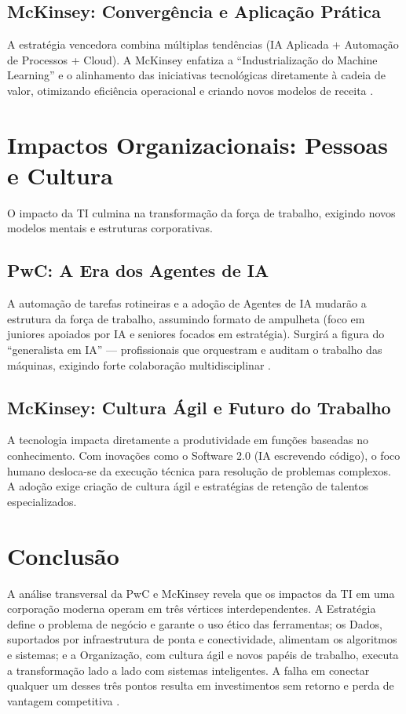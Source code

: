 \documentclass[12pt,a4paper,oneside]{article}
\begin{document}
\subsection{McKinsey: Convergência e Aplicação Prática}

A estratégia vencedora combina múltiplas tendências (IA Aplicada + Automação de Processos + Cloud). A McKinsey enfatiza a ``Industrialização do Machine Learning'' e o alinhamento das iniciativas tecnológicas diretamente à cadeia de valor, otimizando eficiência operacional e criando novos modelos de receita \cite{rocha2018}.

\section{Impactos Organizacionais: Pessoas e Cultura}

O impacto da TI culmina na transformação da força de trabalho, exigindo novos modelos mentais e estruturas corporativas.

\subsection{PwC: A Era dos Agentes de IA}

A automação de tarefas rotineiras e a adoção de Agentes de IA mudarão a estrutura da força de trabalho, assumindo formato de ampulheta (foco em juniores apoiados por IA e seniores focados em estratégia). Surgirá a figura do ``generalista em IA'' --- profissionais que orquestram e auditam o trabalho das máquinas, exigindo forte colaboração multidisciplinar \cite{pwc2024}.

\subsection{McKinsey: Cultura Ágil e Futuro do Trabalho}

A tecnologia impacta diretamente a produtividade em funções baseadas no conhecimento. Com inovações como o Software 2.0 (IA escrevendo código), o foco humano desloca-se da execução técnica para resolução de problemas complexos. A adoção exige criação de cultura ágil e estratégias de retenção de talentos especializados.

\section{Conclusão}

A análise transversal da PwC e McKinsey revela que os impactos da TI em uma corporação moderna operam em três vértices interdependentes. A Estratégia define o problema de negócio e garante o uso ético das ferramentas; os Dados, suportados por infraestrutura de ponta e conectividade, alimentam os algoritmos e sistemas; e a Organização, com cultura ágil e novos papéis de trabalho, executa a transformação lado a lado com sistemas inteligentes. A falha em conectar qualquer um desses três pontos resulta em investimentos sem retorno e perda de vantagem competitiva \cite{kluyver2007}.



\end{document}
